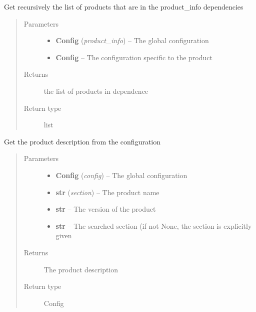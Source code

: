 \documentclass[a4paper,10pt,english]{sphinxmanual}
\begin{document}
\begin{fulllineitems}
\label{commands/apidoc/src:src.product.get_product_dependencies}
Get recursively the list of products that are 
in the product\_info dependencies
\begin{quote}\begin{description}
\item[{Parameters}] \leavevmode\begin{itemize}
\item {} 
\textbf{Config} (\emph{product\_info}) -- The global configuration

\item {} 
\textbf{Config} -- The configuration specific to 
the product

\end{itemize}

\item[{Returns}] \leavevmode
the list of products in dependence

\item[{Return type}] \leavevmode
list

\end{description}\end{quote}

\end{fulllineitems}


\begin{fulllineitems}
\label{commands/apidoc/src:src.product.get_product_section}
Get the product description from the configuration
\begin{quote}\begin{description}
\item[{Parameters}] \leavevmode\begin{itemize}
\item {} 
\textbf{Config} (\emph{config}) -- The global configuration

\item {} 
\textbf{str} (\emph{section}) -- The product name

\item {} 
\textbf{str} -- The version of the product

\item {} 
\textbf{str} -- The searched section (if not None, the section is 
explicitly given

\end{itemize}

\item[{Returns}] \leavevmode
The product description

\item[{Return type}] \leavevmode
Config

\end{description}\end{quote}

\end{fulllineitems}
\end{document}
